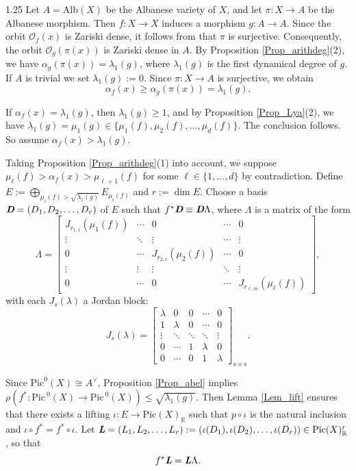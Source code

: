 \documentclass[12pt]{amsart}
\newcommand\mO{\mathcal{O}}
\newcommand{\mb}[1]{\mathbb{#1}}
\newcommand{\mr}[1]{\mathrm{#1}}
\newcommand\ra{\rightarrow}
\newcommand\Pic{\mathrm{Pic\,}}
\newcommand{\mib}[1]{\textit{\textbf{#1}}}
\begin{document}
\begin{spacing}{1.25}
Let $A = \mathrm{Alb}(X)$ be the Albanese variety of $X$, and let $\pi: X \to A$ be the Albanese morphism. Then $f:X \to X$ induces a morphism $g: A \to A$. Since the orbit $\mO_f(x)$ is Zariski dense, it follows from \cite[Proposition 3.7]{LM21} that $\pi$ is surjective. Consequently, the orbit $\mO_g(\pi(x))$ is Zariski dense in $A$. By Proposition \ref{Prop_arithdeg}(2), we have $\alpha_g(\pi(x))=\lambda_1(g)$, where $\lambda_1(g)$ is the first dynamical degree of $g$. If $A$ is trivial we set $\lambda_1(g):=0$. Since $\pi: X\ra A$ is surjective, we obtain 
\[\alpha_f(x)\geq \alpha_g(\pi(x))=\lambda_1(g).\] 

If $\alpha_f(x)=\lambda_1(g)$, then $\lambda_1(g)\geq 1$, and by Proposition \ref{Prop_Lya}(2), we have $\lambda_1(g)=\mu_1(g)\in \{\mu_1(f), \mu_2(f), \ldots,\mu_d(f)\}$. The conclusion follows. So assume $\alpha_f(x)>\lambda_1(g)$. 

Taking Proposition \ref{Prop_arithdeg}(1) into account, we suppose $\mu_{\ell}(f)>\alpha_f(x)>\mu_{\ell+1}(f)$ for some $\ell\in\{1,\dots,d\}$ by contradiction. Define $E:=\bigoplus\limits_{\mu_i(f)>\sqrt{\lambda_1(g)}}E_{\mu_i(f)}$ and $r:=\dim E$. Choose a basis $\mib{D}=(D_1,D_2,\ldots,D_r)$ of $E$ such that $f^*\mib{D}\equiv \mib{D} \Lambda$, where $\Lambda$ is a matrix of the form
\[
\Lambda = 
\begin{bmatrix}
J_{r_{1,1}}(\mu_1(f)) &   \cdots     & 0               & \cdots          & 0 \\
\vdots         &\ddots       & \vdots              & \cdots          & \vdots\\
0              & \cdots        & J_{r_{2,1}}(\mu_2(f)) & \cdots          & 0 \\
\vdots         &\vdots         & \vdots            & \ddots          & \vdots \\
0              & \cdots       & 0                 & \cdots          & J_{r_{\ell,m}}(\mu_{\ell}(f))
\end{bmatrix},
\]
with each $J_s(\lambda)$ a Jordan block:
\[J_{s}(\lambda) = 
\begin{bmatrix}
\lambda & 0 & 0 & \cdots & 0 \\
1 & \lambda & 0 & \cdots & 0 \\
\vdots & \ddots & \ddots & \ddots & \vdots \\
0 & \cdots & 1 & \lambda & 0 \\
0 & \cdots & 0 & 1 & \lambda
\end{bmatrix}_{s\times s}.\]

Since $\mr{Pic}^0(X)\cong A^{\vee}$, Proposition \ref{Prop_abel} implies $\rho(f^*:\Pic^0(X)\rightarrow\Pic^0(X))\leq \sqrt{\lambda_1(g)}$. Then Lemma \ref{Lem_lift} ensures that there exists a lifting $\iota: E\ra \mr{Pic}(X)_{\mb{R}}$ such that $p\circ \iota$ is the natural inclusion and $\iota\circ f^*=f^*\circ \iota$. Let $\mib{L}=(L_1,L_2,\ldots,L_r):=(\iota(D_1),\iota(D_2),\ldots,\iota(D_r))\in \mr{Pic}(X)_{\mb{R}}^{r}$, so that
\[f^*\mib{L}=\mib{L}\Lambda.\]


\end{spacing}
\end{document}
